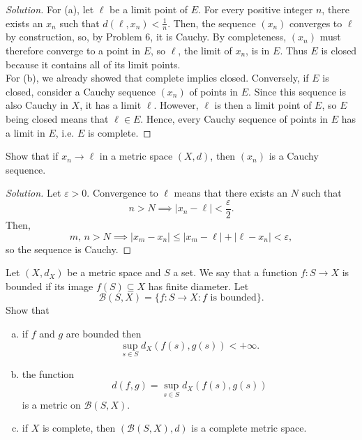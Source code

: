 \documentclass[11pt]{scrartcl}
\providecommand{\eps}{\varepsilon}
\providecommand{\ii}{\item}
\newenvironment{soln}{\begin{proof}[Solution]}{\end{proof}}
\begin{document}
\begin{soln}
	For (a), let $\ell$ be a limit point of $E$.
	For every positive integer $n$, there exists an $x_n$
	such that $d(\ell, x_n) < \frac 1n$.
	Then, the sequence $(x_n)$ converges to $\ell$ by construction,
	so, by Problem 6, it is Cauchy. By completeness,
	$(x_n)$ must therefore converge to a point in $E$,
	so $\ell$, the limit of $x_n$, is in $E$.
	Thus $E$ is closed because it contains all of its limit points.\\
	
	For (b), we already showed that complete implies closed.
	Conversely, if $E$ is closed, consider a Cauchy sequence
	$(x_n)$ of points in $E$. Since this sequence is also Cauchy in $X$,
	it has a limit $\ell$. However, $\ell$ is then a limit point of $E$,
	so $E$ being closed means that $\ell\in E$.
	Hence, every Cauchy sequence of points in $E$
	has a limit in $E$, i.e. $E$ is complete.
\end{soln}

\begin{problem}
	Show that if $x_n\to\ell$ in a metric space $(X, d)$,
	then $(x_n)$ is a Cauchy sequence.
\end{problem}

\begin{soln}
	Let $\eps > 0$. Convergence to $\ell$ means that
	there exists an $N$ such that
	\[n > N \implies |x_n - \ell| < \frac\eps2.\]
	Then,
	\[m,\,n > N \implies |x_m - x_n| \le
	|x_m - \ell| + |\ell - x_n| < \eps,\]
	so the sequence is Cauchy.
\end{soln}

\begin{problem}
	Let $(X, d_X)$ be a metric space and $S$ a set.
	We say that a function $f\colon S\to X$ is bounded
	if its image $f(S)\subseteq X$ has finite diameter.
	Let
	\[\mathcal B(S, X) = \{f\colon S\to X : f\text{ is bounded}\}.\]
	Show that
	\begin{enumerate}[(a)]
		\ii if $f$ and $g$ are bounded then
		\[\sup_{s\in S} d_X(f(s), g(s)) < +\infty.\]
		\ii the function
		\[d(f, g) = \sup_{s\in S} d_X(f(s), g(s))\]
		is a metric on $\mathcal B(S, X)$.
		\ii if $X$ is complete, then $(\mathcal B(S, X), d)$
		is a complete metric space.
	\end{enumerate}
\end{problem}
\end{document}
